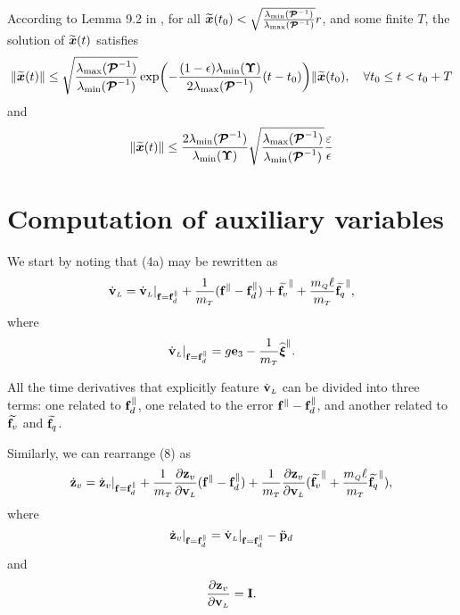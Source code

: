 \documentclass[journal,onecolumn]{IEEEtran}
\begin{document}
According to Lemma 9.2 in \cite{2002_Khalil}, for all $\widetilde{\boldsymbol{x}}(t_0)<\sqrt{\frac{\lambda_{\min}(\boldsymbol{\mathcal{P}}^{-1})}{\lambda_{\max}(\boldsymbol{\mathcal{P}}^{-1})}}r$, and some finite $T$, the solution of $\widetilde{\boldsymbol{x}}(t)$ satisfies
%
\begin{equation}
	\|\widetilde{\boldsymbol{x}}(t)\|\leq \sqrt{\frac{\lambda_{\max}(\boldsymbol{\mathcal{P}}^{-1})}{\lambda_{\min}(\boldsymbol{\mathcal{P}}^{-1})}}\exp(-\frac{(1-\epsilon)\lambda_{\min}(\boldsymbol{\Upsilon})}{2\lambda_{\max}(\boldsymbol{\mathcal{P}}^{-1})}(t-t_0))\|\widetilde{\boldsymbol{x}}(t_0), \quad\forall t_0\leq t<t_0+T
\end{equation}
%
and
%
\begin{equation}
	\|\widetilde{\boldsymbol{x}}(t)\|\leq \frac{2\lambda_{\min}(\boldsymbol{\mathcal{P}}^{-1})}{\lambda_{\min}(\boldsymbol{\Upsilon})} \sqrt{\frac{\lambda_{\max}(\boldsymbol{\mathcal{P}}^{-1})}{\lambda_{\min}(\boldsymbol{\mathcal{P}}^{-1})}}\frac{\varepsilon}{\epsilon}
\end{equation}

\section{Computation of auxiliary variables}
\label{sec:aux_notation}

	We start by noting that (4a) may be rewritten as
	\begin{equation}
		\vLdot = \vLdot|_{\f=\fd^{\|}} + \frac{1}{\mT}(\f^{\|}-\fd^{\|}) + \widetilde{\f_v}^{\|} + \frac{\mQ\ellp}{\mT}\widetilde{\f_q}^{\|},
		\label{eq:vL_dot_aux1}
	\end{equation}
	where
	\begin{equation}
		\vLdot|_{\f=\fd^{\|}} = g\ez - \frac{1}{\mT}\widehat{\Xiq}^{\|}.
	\end{equation}

	All the time derivatives that explicitly feature $\vLdot$ can be divided into three terms: one related to $\fd^{\|}$, one related to the error $\f^{\|}-\fd^{\|}$, and another related to $\widetilde{\f_v}$ and $\widetilde{\f_q}$.

	Similarly, we can rearrange (8) as
	\begin{equation}
		\zvdot = \zvdot|_{\f=\fd^{\|}} + \frac{1}{\mT}\frac{\partial\zv}{\partial\vL}(\f^{\|}-\fd^{\|}) + \frac{1}{\mT}\frac{\partial\zv}{\partial\vL}(\widetilde{\f_v}^{\|} + \frac{\mQ\ellp}{\mT}\widetilde{\f_q}^{\|}),
		\label{eq:zv_dot_aux1}
	\end{equation}
	where
	\begin{equation}
		\zvdot|_{\f=\fd^{\|}} = \vLdot|_{\f=\fd^{\|}} - \pLdddot
	\end{equation}
	and
	\begin{equation}
		\frac{\partial\zv}{\partial\vL} = \v{I}.
	\end{equation}
\end{document}

